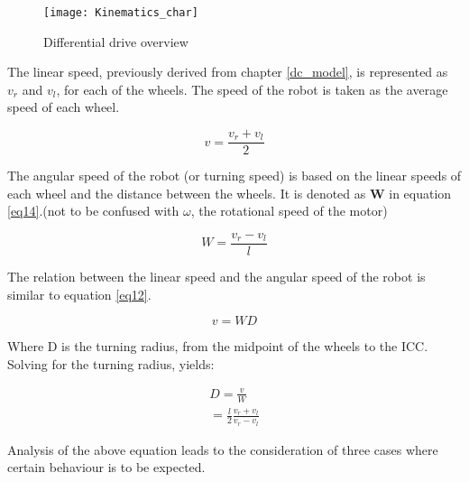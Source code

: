 \begin{figure}[h]
\centering
\texttt{[image: Kinematics\_char]}
\caption{Differential drive overview}
\label{fig::diff_drive_over}
\end{figure}

The linear speed, previously derived from chapter \ref{dc_model}, is represented as $v_r$ and $v_l$, for each of the wheels. The speed of the robot is taken as the average speed of each wheel.

\begin{equation} \label{eq13}
v = \frac{v_r + v_l}{2} 
\end{equation}

The angular speed of the robot (or turning speed) is based on the linear speeds of each wheel and the distance between the wheels. It is denoted as \textbf{W} in equation \ref{eq14}.(not to be confused with $\omega$, the rotational speed of the motor)

\begin{equation} \label{eq14}
W = \frac{v_r - v_l}{l}
\end{equation}

The relation between the linear speed and the angular speed of the robot is similar to equation \ref{eq12}.

\begin{equation} \label{eq15} 
v = WD
\end{equation}

Where D is the turning radius, from the midpoint of the wheels to the ICC. Solving for the turning radius, yields:

\begin{align}
D = \frac{v}{W} \label{eq16} \\
= \frac{l}{2}\frac{v_r + v_l}{v_r - v_l} \nonumber
\end{align}

Analysis of the above equation leads to the consideration of three cases where certain behaviour is to be expected.

